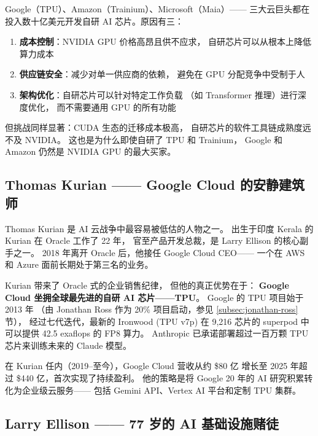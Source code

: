 \begin{whybox}[为什么云巨头纷纷自研 AI 芯片？]
Google（TPU）、Amazon（Trainium）、Microsoft（Maia）——
三大云巨头都在投入数十亿美元开发自研 AI 芯片。原因有三：
\begin{enumerate}[noitemsep]
  \item \textbf{成本控制}：NVIDIA GPU 价格高昂且供不应求，
        自研芯片可以从根本上降低算力成本
  \item \textbf{供应链安全}：减少对单一供应商的依赖，
        避免在 GPU 分配竞争中受制于人
  \item \textbf{架构优化}：自研芯片可以针对特定工作负载
        （如 Transformer 推理）进行深度优化，
        而不需要通用 GPU 的所有功能
\end{enumerate}
但挑战同样显著：CUDA 生态的迁移成本极高，
自研芯片的软件工具链成熟度远不及 NVIDIA。
这也是为什么即使自研了 TPU 和 Trainium，
Google 和 Amazon 仍然是 NVIDIA GPU 的最大买家。
\end{whybox}

\subsection{Thomas Kurian —— Google Cloud 的安静建筑师}
\label{subsec:kurian}

Thomas Kurian 是 AI 云战争中最容易被低估的人物之一。
出生于印度 Kerala 的 Kurian 在 Oracle 工作了 22 年，
官至产品开发总裁，是 Larry Ellison 的核心副手之一。
2018 年离开 Oracle 后，他接任 Google Cloud CEO——
一个在 AWS 和 Azure 面前长期处于第三名的业务。

Kurian 带来了 Oracle 式的企业销售纪律，
但他的真正优势在于：
\textbf{Google Cloud 坐拥全球最先进的自研 AI 芯片——TPU}。
Google 的 TPU 项目始于 2013 年
（由 Jonathan Ross 作为 20\% 项目启动，参见 \ref{subsec:jonathan-ross} 节），
经过七代迭代，最新的 Ironwood (TPU v7p) 在 9,216 芯片的 superpod 中
可以提供 42.5 exaflops 的 FP8 算力。
Anthropic 已承诺部署超过一百万颗 TPU 芯片来训练未来的 Claude 模型。

在 Kurian 任内（2019--至今），Google Cloud 营收从约 \$80 亿
增长至 2025 年超过 \$440 亿，首次实现了持续盈利。
他的策略是将 Google 20 年的 AI 研究积累转化为企业级云服务——
包括 Gemini API、Vertex AI 平台和定制 TPU 集群。

\subsection{Larry Ellison —— 77 岁的 AI 基础设施赌徒}
\label{subsec:ellison}

